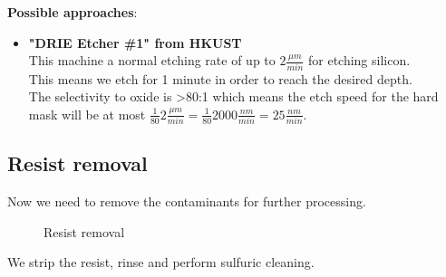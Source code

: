 \textbf{Possible approaches}:
\begin{itemize}
\item \textbf{"DRIE Etcher \#1" from HKUST} \\
This machine a normal etching rate of up to $2\frac{\mu m}{min}$ for etching silicon. \\
This means we etch for 1 minute in order to reach the desired depth. \\
The selectivity to oxide is >80:1 which means the etch speed for the hard mask will be at most $\frac{1}{80}2\frac{\mu m}{min}=\frac{1}{80}2000\frac{nm}{min}=25\frac{nm}{min}$.
\end{itemize}

\subsection{Resist removal}

Now we need to remove the contaminants for further processing.

\begin{figure}[H]
	\centering
	\begin{tikzpicture}[node distance = 3cm, auto, thick,scale=\CrossSectionOnly, every node/.style={transform shape}]
		
	\end{tikzpicture}
	\drawStepArrow{}
	\begin{tikzpicture}[node distance = 3cm, auto, thick,scale=\CrossSectionOnly, every node/.style={transform shape}]
		
	\end{tikzpicture}
	\caption{Resist removal}
\end{figure}

We strip the resist, rinse and perform sulfuric cleaning.

\newpage

